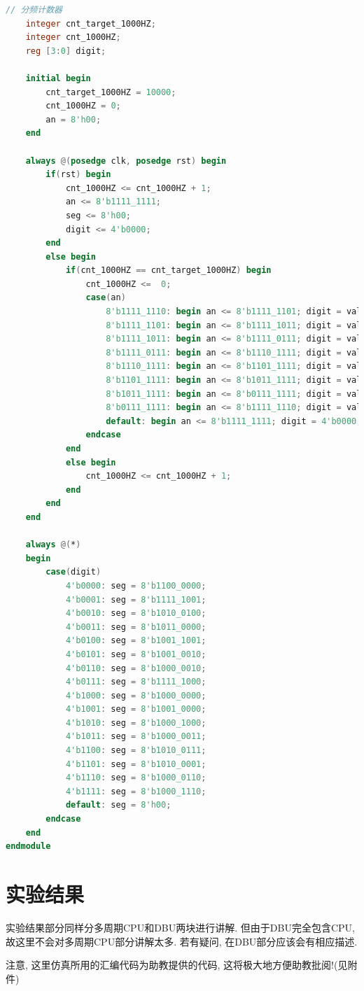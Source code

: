 \documentclass[UTF8]{article}
\begin{document}
\begin{enumerate}
\begin{lstlisting}[language=verilog]
    // 分频计数器
    integer cnt_target_1000HZ;
    integer cnt_1000HZ;
    reg [3:0] digit;
    
    initial begin
        cnt_target_1000HZ = 10000;
        cnt_1000HZ = 0;
        an = 8'h00;
    end
    
    always @(posedge clk, posedge rst) begin
        if(rst) begin
            cnt_1000HZ <= cnt_1000HZ + 1;
            an <= 8'b1111_1111;
            seg <= 8'h00;
            digit <= 4'b0000;
        end
        else begin
            if(cnt_1000HZ == cnt_target_1000HZ) begin
                cnt_1000HZ <=  0;
                case(an)
                    8'b1111_1110: begin an <= 8'b1111_1101; digit = value[3:0]; end
                    8'b1111_1101: begin an <= 8'b1111_1011; digit = value[7:3]; end
                    8'b1111_1011: begin an <= 8'b1111_0111; digit = value[11:7]; end
                    8'b1111_0111: begin an <= 8'b1110_1111; digit = value[15:11]; end
                    8'b1110_1111: begin an <= 8'b1101_1111; digit = value[19:15]; end
                    8'b1101_1111: begin an <= 8'b1011_1111; digit = value[23:19]; end
                    8'b1011_1111: begin an <= 8'b0111_1111; digit = value[27:23]; end
                    8'b0111_1111: begin an <= 8'b1111_1110; digit = value[31:27]; end
                    default: begin an <= 8'b1111_1111; digit = 4'b0000; end
                endcase
            end
            else begin
                cnt_1000HZ <= cnt_1000HZ + 1;
            end
        end
    end
    
    always @(*)
    begin
        case(digit)
            4'b0000: seg = 8'b1100_0000;
            4'b0001: seg = 8'b1111_1001;
            4'b0010: seg = 8'b1010_0100;
            4'b0011: seg = 8'b1011_0000;
            4'b0100: seg = 8'b1001_1001;
            4'b0101: seg = 8'b1001_0010;
            4'b0110: seg = 8'b1000_0010;
            4'b0111: seg = 8'b1111_1000;
            4'b1000: seg = 8'b1000_0000;
            4'b1001: seg = 8'b1001_0000;
            4'b1010: seg = 8'b1000_1000;
            4'b1011: seg = 8'b1000_0011;
            4'b1100: seg = 8'b1010_0111;
            4'b1101: seg = 8'b1010_0001;
            4'b1110: seg = 8'b1000_0110;
            4'b1111: seg = 8'b1000_1110;
            default: seg = 8'h00;
        endcase
    end
endmodule
	\end{lstlisting}
\end{enumerate}

\section{实验结果}
实验结果部分同样分多周期CPU和DBU两块进行讲解. 但由于DBU完全包含CPU, 故这里不会对多周期CPU部分讲解太多. 若有疑问, 在DBU部分应该会有相应描述.\par
注意, 这里仿真所用的汇编代码为助教提供的代码, 这将极大地方便助教批阅!(见附件)\par
\end{document}
